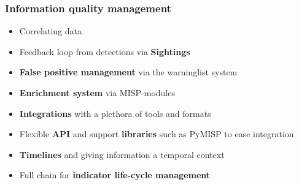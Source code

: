 \begin{frame}
\frametitle{Information quality management}
    \begin{itemize}
        \item Correlating data
        \item Feedback loop from detections via {\bf Sightings}
        \item {\bf False positive management} via the warninglist system
        \item {\bf Enrichment system} via MISP-modules
        \item {\bf Integrations} with a plethora of tools and formats
        \item Flexible {\bf API} and support {\bf libraries} such as PyMISP to ease integration
        \item {\bf Timelines} and giving information a temporal context
        \item Full chain for {\bf indicator life-cycle management}
    \end{itemize}
\end{frame}


